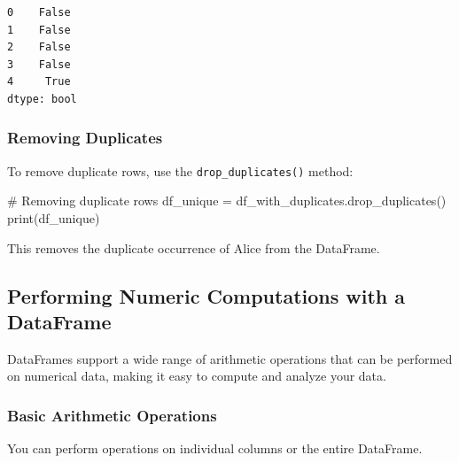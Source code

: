 \documentclass[
  letterpaper,
  DIV=11,
  numbers=noendperiod]{scrreprt}
\newenvironment{Shaded}{\begin{snugshade}}{\end{snugshade}}
\newcommand{\BuiltInTok}[1]{\textcolor[rgb]{0.00,0.23,0.31}{#1}}
\newcommand{\CommentTok}[1]{\textcolor[rgb]{0.37,0.37,0.37}{#1}}
\newcommand{\NormalTok}[1]{\textcolor[rgb]{0.00,0.23,0.31}{#1}}
\newcommand{\OperatorTok}[1]{\textcolor[rgb]{0.37,0.37,0.37}{#1}}
\begin{document}
\begin{verbatim}
0    False
1    False
2    False
3    False
4     True
dtype: bool
\end{verbatim}

\hypertarget{removing-duplicates-1}{%
\subsubsection{Removing Duplicates}\label{removing-duplicates-1}}

To remove duplicate rows, use the \texttt{drop\_duplicates()} method:

\begin{Shaded}
\begin{Highlighting}[]
\CommentTok{\# Removing duplicate rows}
\NormalTok{df\_unique }\OperatorTok{=}\NormalTok{ df\_with\_duplicates.drop\_duplicates()}
\BuiltInTok{print}\NormalTok{(df\_unique)}
\end{Highlighting}
\end{Shaded}

This removes the duplicate occurrence of Alice from the DataFrame.

\hypertarget{performing-numeric-computations-with-a-dataframe}{%
\subsection{Performing Numeric Computations with a
DataFrame}\label{performing-numeric-computations-with-a-dataframe}}

DataFrames support a wide range of arithmetic operations that can be
performed on numerical data, making it easy to compute and analyze your
data.

\hypertarget{basic-arithmetic-operations-1}{%
\subsubsection{Basic Arithmetic
Operations}\label{basic-arithmetic-operations-1}}

You can perform operations on individual columns or the entire
DataFrame.
\end{document}
